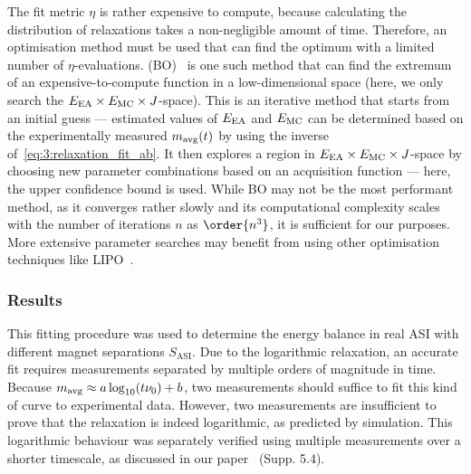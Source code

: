 The fit metric $\eta$ is rather expensive to compute, because calculating the distribution of relaxations takes a non-negligible amount of time.
Therefore, an optimisation method must be used that can find the optimum with a limited number of $\eta$-evaluations.
 (BO)~\cite{bayesopt_package,BayesOpt_Mockus1975} is one such method that can find the extremum of an expensive-to-compute function in a low-dimensional space (here, we only search the $E_\mathrm{EA} \times E_\mathrm{MC} \times J$-space).
This is an iterative method that starts from an initial guess --- estimated values of $E_\mathrm{EA}$ and $E_\mathrm{MC}$ can be determined based on the experimentally measured $m_\mathrm{avg}(t)$ by using the inverse of~\cref{eq:3:relaxation_fit_ab}.
It then explores a region in $E_\mathrm{EA} \times E_\mathrm{MC} \times J$-space by choosing new parameter combinations based on an acquisition function --- here, the upper confidence bound is used.
While BO may not be the most performant method, as it converges rather slowly and its computational complexity scales with the number of iterations $n$ as $\order{n^3}$, it is sufficient for our purposes.
More extensive parameter searches may benefit from using other optimisation techniques like LIPO~\cite{LIPO,LIPO_dlib}. \\\par

\subsubsection{Results} 
This fitting procedure was used to determine the energy balance in real ASI with different magnet separations $S_\mathrm{ASI}$.
Due to the logarithmic relaxation, an accurate fit requires measurements separated by multiple orders of magnitude in time.
Because $m_\mathrm{avg} \approx a \log_{10}(t \nu_0) + b$, two measurements should suffice to fit this kind of curve to experimental data.
However, two measurements are insufficient to prove that the relaxation is indeed logarithmic, as predicted by simulation.
This logarithmic behaviour was separately verified using multiple measurements over a shorter timescale, as discussed in our paper~\cite{KUR-24} (Supp. 5.4).

